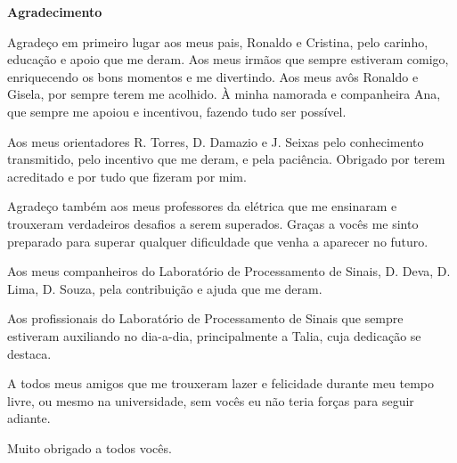 \cleardoublepage

\begin{center}
\textbf{\Large Agradecimento}
\end{center}

Agradeço em primeiro lugar aos meus pais, Ronaldo e Cristina, 
pelo carinho, educação e apoio que me deram. Aos meus irmãos que sempre
estiveram comigo, enriquecendo os bons momentos e me divertindo. Aos meus 
avôs Ronaldo e Gisela, por sempre terem me acolhido. À minha namorada e 
companheira Ana, que sempre me apoiou e incentivou, fazendo tudo ser possível.

Aos meus orientadores R. Torres, D. Damazio e J. Seixas pelo conhecimento
transmitido, pelo incentivo que me deram, e pela paciência. Obrigado 
por terem acreditado e por tudo que fizeram por mim.

Agradeço também aos meus professores da elétrica que me ensinaram e trouxeram 
verdadeiros desafios a serem superados. Graças a vocês me sinto preparado para
superar qualquer dificuldade que venha a aparecer no futuro.

Aos meus companheiros do Laboratório de Processamento de Sinais, D. Deva, D. Lima,
D. Souza, pela contribuição e ajuda que me deram.

Aos profissionais do Laboratório de Processamento de Sinais que sempre 
estiveram auxiliando no dia-a-dia, principalmente a Talia, cuja 
dedicação se destaca.

A todos meus amigos que me trouxeram lazer e felicidade durante meu tempo livre, ou
mesmo na universidade, sem vocês eu não teria forças para seguir adiante.

Muito obrigado a todos vocês.
